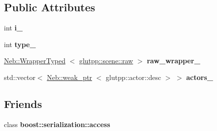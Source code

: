 \subsection*{\-Public \-Attributes}
\begin{DoxyCompactItemize}
\item 
\hypertarget{classglutpp_1_1scene_1_1desc_ac190024571d236c1afd7486e8a060551}{int {\bfseries i\-\_\-}}\label{classglutpp_1_1scene_1_1desc_ac190024571d236c1afd7486e8a060551}

\item 
\hypertarget{classglutpp_1_1scene_1_1desc_a29271bc477078880f196dc9db95b681a}{int {\bfseries type\-\_\-}}\label{classglutpp_1_1scene_1_1desc_a29271bc477078880f196dc9db95b681a}

\item 
\hypertarget{classglutpp_1_1scene_1_1desc_a7111c2115c45c44d416d47484b87b1c8}{\hyperlink{classNeb_1_1WrapperTyped}{\-Neb\-::\-Wrapper\-Typed}\*
$<$ \hyperlink{classglutpp_1_1scene_1_1raw}{glutpp\-::scene\-::raw} $>$ {\bfseries raw\-\_\-wrapper\-\_\-}}\label{classglutpp_1_1scene_1_1desc_a7111c2115c45c44d416d47484b87b1c8}

\item 
\hypertarget{classglutpp_1_1scene_1_1desc_ac3c91b43ba95990985eded44bb61a11b}{std\-::vector$<$ \hyperlink{classNeb_1_1weak__ptr}{\-Neb\-::weak\-\_\-ptr}\*
$<$ glutpp\-::actor\-::desc $>$ $>$ {\bfseries actors\-\_\-}}\label{classglutpp_1_1scene_1_1desc_ac3c91b43ba95990985eded44bb61a11b}

\end{DoxyCompactItemize}
\subsection*{\-Friends}
\begin{DoxyCompactItemize}
\item 
\hypertarget{classglutpp_1_1scene_1_1desc_ac98d07dd8f7b70e16ccb9a01abf56b9c}{class {\bfseries boost\-::serialization\-::access}}\label{classglutpp_1_1scene_1_1desc_ac98d07dd8f7b70e16ccb9a01abf56b9c}

\end{DoxyCompactItemize}


